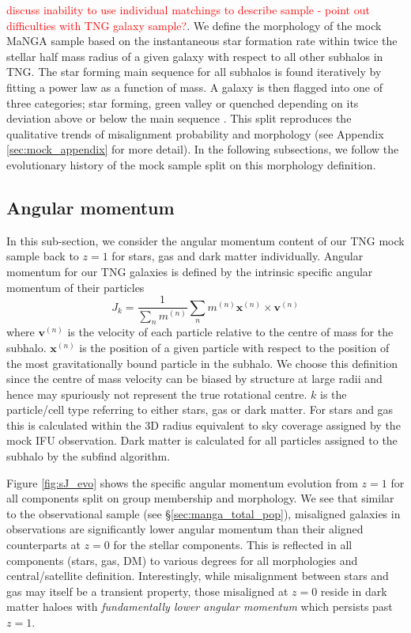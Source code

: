 \documentclass[fleqn,usenatbib]{mnras}
\newcommand{\red}[1]{{\textcolor{red}{#1}}}
\begin{document}
\red{discuss inability to use individual matchings to describe sample - point out difficulties with TNG galaxy sample?}. 
We define the morphology of the mock MaNGA sample based on the instantaneous star formation rate within twice the stellar half mass radius of a given galaxy with respect to all other subhalos in TNG. The star forming main sequence for all subhalos is found iteratively by fitting a power law as a function of mass. A galaxy is then flagged into one of three categories; star forming, green valley or quenched depending on its deviation above or below the main sequence \citep{pillepich2019}. This split reproduces the qualitative trends of misalignment probability and morphology (see Appendix \ref{sec:mock_appendix} for more detail). In the following subsections, we follow the evolutionary history of the mock sample split on this morphology definition. 

\subsection{Angular momentum}
In this sub-section, we consider the angular momentum content of our TNG mock sample back to $z=1$ for stars, gas and dark matter individually. Angular momentum for our TNG galaxies is defined by the intrinsic specific angular momentum of their particles
\begin{equation}
J_{k} = \frac{1}{\sum_{n} m^{(n)}} \sum_{n} m^{(n)}\boldsymbol{x}^{(n)} \times \boldsymbol{v}^{(n)}
\end{equation}
where $\boldsymbol{v}^{(n)}$ is the velocity of each particle relative to the centre of mass for the subhalo. $\boldsymbol{x}^{(n)}$ is the position of a given particle with respect to the position of the most gravitationally bound particle in the subhalo. We choose this definition since the centre of mass velocity can be biased by structure at large radii and hence may spuriously not represent the true rotational centre. $k$ is the particle/cell type referring to either stars, gas or dark matter. For stars and gas this is calculated within the 3D radius equivalent to sky coverage assigned by the mock IFU observation. Dark matter is calculated for all particles assigned to the subhalo by the subfind algorithm. 

Figure \ref{fig:sJ_evo} shows the specific angular momentum evolution from $z=1$ for all components split on group membership and morphology. We see that similar to the observational sample (see \S\ref{sec:manga_total_pop}), misaligned galaxies in observations are significantly lower angular momentum than their aligned counterparts at $z=0$ for the stellar components. This is reflected in all components (stars, gas, DM) to various degrees for all morphologies and central/satellite definition. Interestingly, while misalignment between stars and gas may itself be a transient property, those misaligned at $z = 0$ reside in dark matter haloes with \textit{fundamentally lower angular momentum} which persists past $z = 1$. 
\end{document}
